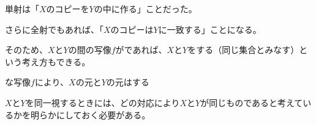 \documentclass[../../../topic_linear-algebra]{subfiles}
\begin{document}
単射は「$X$のコピーを$Y$の中に作る」ことだった。

さらに全射でもあれば、「$X$のコピーは$Y$に一致する」ことになる。

\br

そのため、$X$と$Y$の間の写像$f$がであれば、$X$と$Y$をする（同じ集合とみなす）という考え方もできる。

\begin{emphabox}
  \begin{spacebox}
    \begin{center}
      な写像$f$により、$X$の元と$Y$の元はする
    \end{center}
  \end{spacebox}
\end{emphabox}

$X$と$Y$を同一視するときには、どの対応により$X$と$Y$が同じものであると考えているかを明らかにしておく必要がある。
\end{document}

